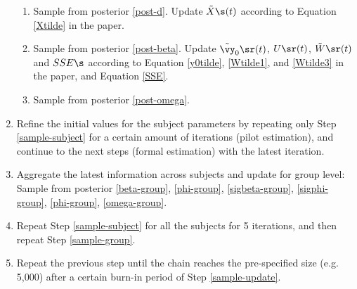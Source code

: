 \begin{enumerate}
\begin{enumerate}
	  \item Sample from posterior \eqref{post-d}. Update $\tilde{X}\s(t)$ according to Equation \eqref{Xtilde} in the paper.
	   \item Sample from posterior \eqref{post-beta}. Update $\tilde{\vy}_0\sr(t)$, $U\sr(t)$, $\tilde{W}\sr(t)$ and $SSE\s$ according to Equation \eqref{y0tilde}, \eqref{Wtilde1}, and \eqref{Wtilde3} in the paper, and Equation \eqref{SSE}.
	   \item Sample from posterior \eqref{post-omega}. 
	\end{enumerate}  
 \item \label{sample-pilot}
Refine the initial values for the subject parameters by repeating only Step \ref{sample-subject} for a certain amount of iterations (pilot estimation), and continue {\color{blue}to} the next steps (formal estimation) {\color{blue}with} the latest iteration. 
  \item \label{sample-group}
Aggregate the latest information across subjects and update for group level: 
Sample from posterior \eqref{beta-group}, \eqref{phi-group}, %
     \eqref{sigbeta-group}, \eqref{sigphi-group}, \eqref{phi-group}, \eqref{omega-group}.
 \item \label{sample-update}
Repeat Step \ref{sample-subject} for all the subjects for 5 iterations, and then repeat Step \ref{sample-group}.
 \item \label{sample-repeat}
Repeat the previous step until the chain reaches the pre-specified size (e.g. 5,000) after a certain burn-in period of Step \ref{sample-update}.   
\end{enumerate}




